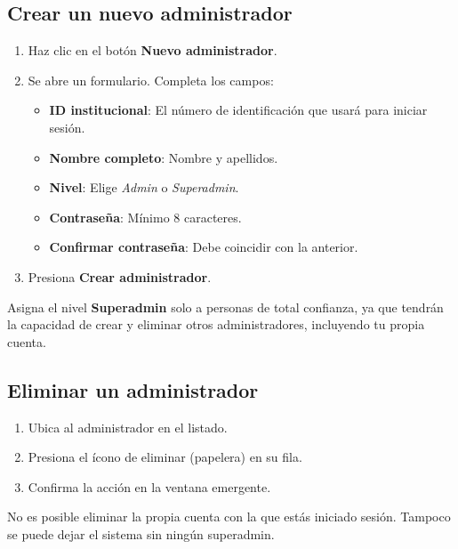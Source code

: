 \documentclass[12pt, a4paper]{article}
\begin{document}
\subsection{Crear un nuevo administrador}

\begin{enumerate}
  \item Haz clic en el botón \textbf{Nuevo administrador}.
  \item Se abre un formulario. Completa los campos:
    \begin{itemize}
      \item \textbf{ID institucional}: El número de identificación que
            usará para iniciar sesión.
      \item \textbf{Nombre completo}: Nombre y apellidos.
      \item \textbf{Nivel}: Elige \emph{Admin} o \emph{Superadmin}.
      \item \textbf{Contraseña}: Mínimo 8 caracteres.
      \item \textbf{Confirmar contraseña}: Debe coincidir con la anterior.
    \end{itemize}
  \item Presiona \textbf{Crear administrador}.
\end{enumerate}

\begin{aviso}
  Asigna el nivel \textbf{Superadmin} solo a personas de total confianza,
  ya que tendrán la capacidad de crear y eliminar otros administradores,
  incluyendo tu propia cuenta.
\end{aviso}

\subsection{Eliminar un administrador}

\begin{enumerate}
  \item Ubica al administrador en el listado.
  \item Presiona el ícono de eliminar (papelera) en su fila.
  \item Confirma la acción en la ventana emergente.
\end{enumerate}

\begin{peligro}
  No es posible eliminar la propia cuenta con la que estás iniciado
  sesión. Tampoco se puede dejar el sistema sin ningún superadmin.
\end{peligro}
\end{document}
